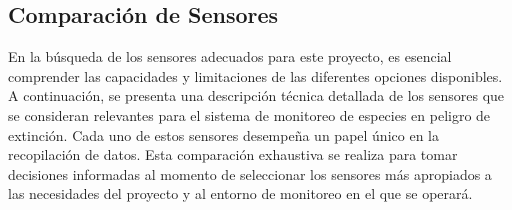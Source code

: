 \subsection{Comparación de Sensores}
En la búsqueda de los sensores adecuados para este proyecto, es esencial comprender las capacidades y limitaciones de las diferentes opciones disponibles. A continuación, se presenta una descripción técnica detallada de los sensores que se consideran relevantes para el sistema de monitoreo de especies en peligro de extinción. Cada uno de estos sensores desempeña un papel único en la recopilación de datos. Esta comparación exhaustiva se realiza para tomar decisiones informadas al momento de seleccionar los sensores más apropiados a las necesidades del proyecto y al entorno de monitoreo en el que se operará.
\begin{itemize}
    


\end{itemize}
